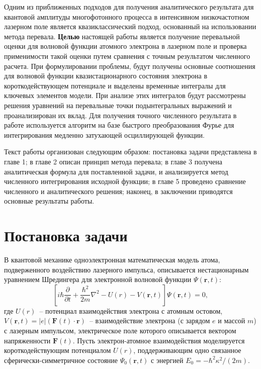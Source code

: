 \documentclass[14pt, a4paper]{article}
\numberwithin{figure}{section}
\numberwithin{equation}{section}
\newcommand{\sectionbreak}{\clearpage}
\newcommand{\vF}{\mathbf{F}}
\newcommand{\vr}{\mathbf{r}}
\begin{document}
Одним из приближенных подходов для получения аналитического результата для квантовой амплитуды многофотонного процесса в интенсивном низкочастотном лазерном поле является квазиклассический подход, основанный на использовании метода перевала. \textbf{Целью} настоящей работы является получение перевальной оценки для волновой функции атомного электрона в лазерном поле и проверка применимости такой оценки путем сравнения с точным результатом численного расчета. При формулировании проблемы, будут получены основные соотношения для волновой функции квазистационарного состояния электрона в короткодействующем потенциале и выделены временные интегралы для ключевых элементов модели. При анализе этих интегралов будут рассмотрены решения уравнений на перевальные точки подынтегральных выражений и проанализирован их вклад. Для получения точного численного результата в работе используется алгоритм на базе быстрого преобразования Фурье для интегрирования медленно затухающей осциллирующей функции.

Текст работы организован следующим образом: постановка задачи представлена в главе 1; в главе 2 описан принцип метода перевала; в главе 3 получена аналитическая формула для поставленной задачи, и анализируется метод численного интегрирования исходной функции; в главе 5 проведено сравнение численного и аналитического решения; наконец, в заключении приводятся основные результаты работы. 
\sectionbreak


\section{Постановка задачи}

В квантовой механике одноэлектронная математическая модель атома, подверженного воздействию
лазерного импульса, описывается нестационарным уравнением Шредингера для электронной волновой функции $\Psi(\vr,t)$:
\begin{equation}
\label{TDSE}
\left[i\hbar\frac{\partial}{\partial t} + \frac{\hbar^2}{2m}\nabla^2 - U(r) - V(\vr,t)\right]\Psi(\vr,t) = 0,
\end{equation}
где $U(r)$~-- потенциал взаимодействия электрона с атомным остовом, $V(\vr,t)=|e|(\vF(t)\cdot\vr)$~-- взаимодействие электрона (с зарядом $e$ и массой $m$) с лазерным импульсом, электрическое поле которого описывается вектором напряженности $\vF(t)$.\cite{7} Пусть электрон-атомное взаимодействия моделируется короткодействующим потенциалом $U(r)$, поддерживающим одно связанное сферически-симметричное состояние $\Psi_0(\vr,t)$ с энергией $E_0=-\hbar^2\kappa^2/(2m)$.
\end{document}
